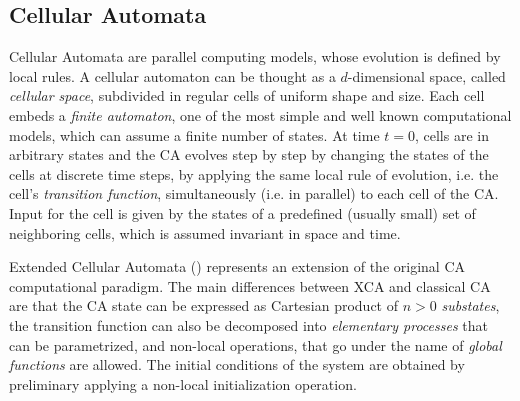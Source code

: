 \subsection{Cellular Automata}\label{sec:CA}
    Cellular Automata \cite{Neumann1966} are parallel computing models, whose evolution
    is defined by local rules. A cellular automaton can be thought as
    a $d$-dimensional space, called \emph{cellular space}, subdivided
    in regular cells of uniform shape and size. Each cell embeds a
    \emph{finite automaton}, one of the most simple and well known
    computational models, which can assume a finite number of
    states. At time $t=0$, cells are in arbitrary states and the CA
    evolves step by step by changing the states of the cells at
    discrete time steps, by applying the same local rule of evolution,
    i.e. the cell's \emph{transition function}, simultaneously
    (i.e. in parallel) to each cell of the CA. Input for the cell is
    given by the states of a predefined (usually small) set of
    neighboring cells, which is assumed invariant in space and time.
 
 Extended Cellular Automata (\cite{toti1999, spataro2014})  represents an extension of the original CA computational paradigm.   
    The main differences between XCA and classical CA are that the CA state can be expressed as Cartesian product of  $n >0$ 
    \emph{substates}, the transition function can also be decomposed into \textit{elementary processes} that can be parametrized,
    and non-local operations, that go under the name of \textit{global functions} are allowed. The initial conditions of the system are obtained by preliminary applying a non-local initialization operation.
    



